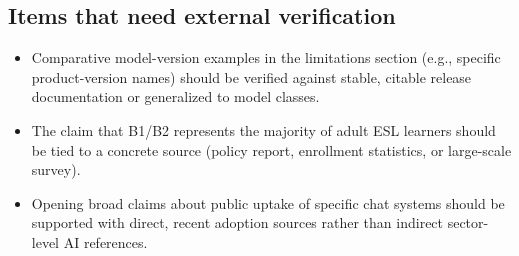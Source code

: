 \documentclass[11pt]{article}
\begin{document}
\subsection*{Items that need external verification}

\begin{itemize}
\item Comparative model-version examples in the limitations section (e.g., specific product-version names) should be verified against stable, citable release documentation or generalized to model classes.
\item The claim that B1/B2 represents the majority of adult ESL learners should be tied to a concrete source (policy report, enrollment statistics, or large-scale survey).
\item Opening broad claims about public uptake of specific chat systems should be supported with direct, recent adoption sources rather than indirect sector-level AI references.
\end{itemize}
\end{document}
